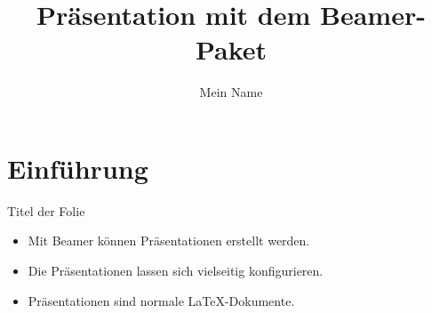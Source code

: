 \documentclass{beamer}
\title{Präsentation mit dem Beamer-Paket}
\author{Mein Name}
\begin{document}
\maketitle
\tableofcontents

\section{Einführung}

\begin{frame}{Titel der Folie}
  \begin{itemize}
    \item<1-> Mit Beamer können Präsentationen erstellt werden.
    \item<2-> Die Präsentationen lassen sich vielseitig konfigurieren.
    \item<3-> Präsentationen sind normale \LaTeX-Dokumente.
  \end{itemize}
\end{frame}
\end{document}

